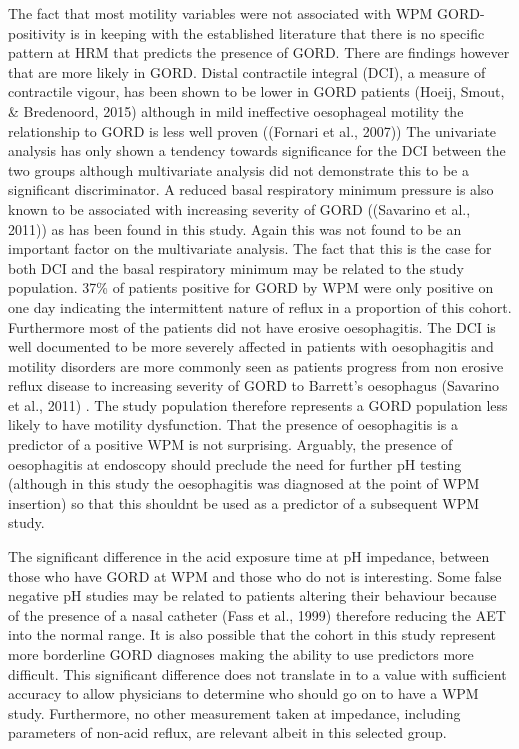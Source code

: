 \documentclass[english,man,floatsintext]{apa6}
\begin{document}
The fact that most motility variables were not associated with WPM GORD-positivity is in keeping with the established literature that there is no specific pattern at HRM that predicts the presence of GORD. There are findings however that are more likely in GORD. Distal contractile integral (DCI), a measure of contractile vigour, has been shown to be lower in GORD patients (Hoeij, Smout, \& Bredenoord, 2015) although in mild ineffective oesophageal motility the relationship to GORD is less well proven ((Fornari et al., 2007)) The univariate analysis has only shown a tendency towards significance for the DCI between the two groups although multivariate analysis did not demonstrate this to be a significant discriminator. A reduced basal respiratory minimum pressure is also known to be associated with increasing severity of GORD ((Savarino et al., 2011)) as has been found in this study. Again this was not found to be an important factor on the multivariate analysis. The fact that this is the case for both DCI and the basal respiratory minimum may be related to the study population. 37\% of patients positive for GORD by WPM were only positive on one day indicating the intermittent nature of reflux in a proportion of this cohort. Furthermore most of the patients did not have erosive oesophagitis. The DCI is well documented to be more severely affected in patients with oesophagitis and motility disorders are more commonly seen as patients progress from non erosive reflux disease to increasing severity of GORD to Barrett's oesophagus (Savarino et al., 2011) . The study population therefore represents a GORD population less likely to have motility dysfunction. That the presence of oesophagitis is a predictor of a positive WPM is not surprising. Arguably, the presence of oesophagitis at endoscopy should preclude the need for further pH testing (although in this study the oesophagitis was diagnosed at the point of WPM insertion) so that this shouldnt be used as a predictor of a subsequent WPM study.

The significant difference in the acid exposure time at pH impedance, between those who have GORD at WPM and those who do not is interesting. Some false negative pH studies may be related to patients altering their behaviour because of the presence of a nasal catheter (Fass et al., 1999) therefore reducing the AET into the normal range. It is also possible that the cohort in this study represent more borderline GORD diagnoses making the ability to use predictors more difficult. This significant difference does not translate in to a value with sufficient accuracy to allow physicians to determine who should go on to have a WPM study. Furthermore, no other measurement taken at impedance, including parameters of non-acid reflux, are relevant albeit in this selected group.
\end{document}
